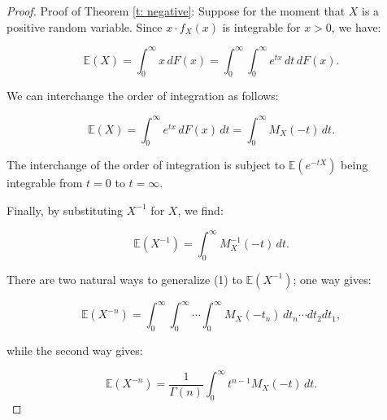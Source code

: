 \begin{proof}
    Proof of Theorem \ref{t: negative}:
Suppose for the moment that \( X \) is a positive random variable. Since \( x \cdot f_X(x) \) is integrable for \( x > 0 \), we have:

\[
    \mathbb{E}(X) = \int_0^\infty x \, dF(x) = \int_0^\infty \int_0^\infty e^{tx} \, dt \, dF(x).
\]

We can interchange the order of integration as follows:

\[
    \mathbb{E}(X) = \int_0^\infty e^{tx} \, dF(x) \, dt = \int_0^\infty M_X(-t) \, dt.
\]

The interchange of the order of integration is subject to \( \mathbb{E}(e^{-tX}) \) being integrable from \( t = 0 \) to \( t = \infty \).

Finally, by substituting \( X^{-1} \) for \( X \), we find:

\[
    \mathbb{E}(X^{-1}) = \int_0^\infty M_X^{-1}(-t) \, dt.
\]

There are two natural ways to generalize (1) to \( \mathbb{E}(X^{-1}) \); one way gives:

\[
    \mathbb{E}(X^{-n}) = \int_0^\infty \int_0^\infty \cdots \int_0^\infty M_X(-t_n) \, dt_n \cdots dt_2 dt_1, \tag{2}
\]

while the second way gives:

\[
    \mathbb{E}(X^{-n}) = \frac{1}{\Gamma(n)} \int_0^\infty t^{n-1} M_X(-t) \, dt.
\]
\cite{cressie1981}
\end{proof}

